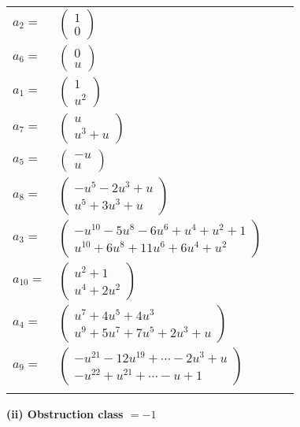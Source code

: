 \documentclass[1p]{elsarticle_modified}
\theoremstyle{definition}
\begin{document}
\begin{tabular}{m{7pt} m{180pt} m{7pt} m{180pt} }
\flushright $a_{2}=$&$\begin{pmatrix}1\\0\end{pmatrix}$ \\
\flushright $a_{6}=$&$\begin{pmatrix}0\\u\end{pmatrix}$ \\
\flushright $a_{1}=$&$\begin{pmatrix}1\\u^2\end{pmatrix}$ \\
\flushright $a_{7}=$&$\begin{pmatrix}u\\u^3+u\end{pmatrix}$ \\
\flushright $a_{5}=$&$\begin{pmatrix}- u\\u\end{pmatrix}$ \\
\flushright $a_{8}=$&$\begin{pmatrix}- u^5-2 u^3+u\\u^5+3 u^3+u\end{pmatrix}$ \\
\flushright $a_{3}=$&$\begin{pmatrix}- u^{10}-5 u^8-6 u^6+u^4+u^2+1\\u^{10}+6 u^8+11 u^6+6 u^4+u^2\end{pmatrix}$ \\
\flushright $a_{10}=$&$\begin{pmatrix}u^2+1\\u^4+2 u^2\end{pmatrix}$ \\
\flushright $a_{4}=$&$\begin{pmatrix}u^7+4 u^5+4 u^3\\u^9+5 u^7+7 u^5+2 u^3+u\end{pmatrix}$ \\
\flushright $a_{9}=$&$\begin{pmatrix}- u^{21}-12 u^{19}+\cdots-2 u^3+u\\- u^{22}+u^{21}+\cdots- u+1\end{pmatrix}$\\&\end{tabular}
\flushleft \textbf{(ii) Obstruction class $= -1$}\\~\\
\end{document}
